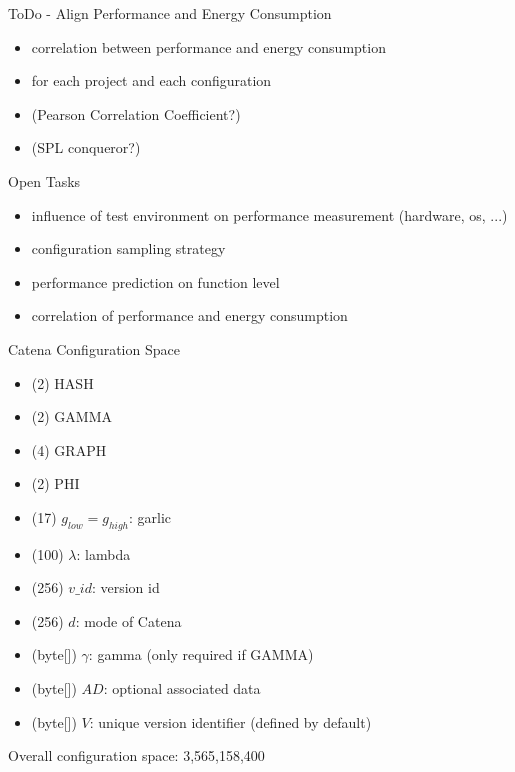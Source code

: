 \documentclass[11pt,aspectratio=169]{beamer}
\begin{document}
\begin{frame}{ToDo - Align Performance and Energy Consumption}
  \begin{itemize}
    \item correlation between performance and energy consumption 
    \item for each project and each configuration
    \item (Pearson Correlation Coefficient?)
    \item (SPL conqueror?)
  \end{itemize}
\end{frame}

\begin{frame}{Open Tasks}
  \begin{itemize}
    \item influence of test environment on performance measurement (hardware, os, ...)
    \item configuration sampling strategy
    \item performance prediction on function level
    \item correlation of performance and energy consumption
  \end{itemize}
\end{frame}


\begin{frame}{Catena Configuration Space}
  \begin{itemize}
    \item (2) HASH
    \item (2) GAMMA
    \item (4) GRAPH
    \item (2) PHI

    \item (17) $g_{low}=g_{high}$: garlic
    \item (100) $\lambda$: lambda
    \item (256) $v\_id$: version id
    \item (256) $d$: mode of Catena
  
    \item (byte[]) $\gamma$: gamma (only required if GAMMA)
    \item (byte[]) $AD$: optional associated data
    \item (byte[]) $V$: unique version identifier (defined by default)
  \end{itemize}
  Overall configuration space: 3,565,158,400
\end{frame}
\end{document}
